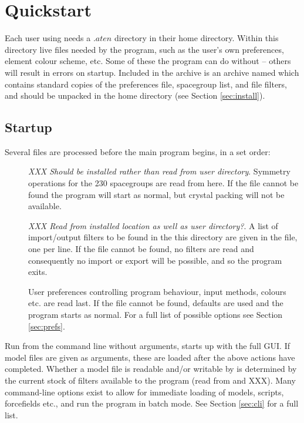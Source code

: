 \chapter{Quickstart}
\label{sec:quickstart}
Each user using \progname{} needs a $.aten$ directory in their home directory. Within this directory live files needed by the program, such as the user's own preferences, element colour scheme, etc. Some of these the program can do without -- others will result in errors on startup. Included in the archive is an archive named  which contains standard copies of the preferences file, spacegroup list, and file filters, and should be unpacked in the home directory (see Section \ref{sec:install}).\\


\section{Startup}
\label{sec:startup}
Several files are processed before the main program begins, in a set order:\\

\begin{description}
\item[{\it {}}\its]
	{\it XXX Should be installed rather than read from user directory}. Symmetry operations for the 230 spacegroups are read from here. If the file cannot be found the program will start as normal, but crystal packing will not be available.

\item[{\it {}}\its]
	{\it XXX Read from installed location as well as user directory?}. A list of import/output filters to be found in the this directory are given in the  file, one per line. If the file cannot be found, no filters are read and consequently no import or export will be possible, and so the program exits.

\item[{\it {}}\its]
	User preferences controlling program behaviour, input methods, colours etc. are read last. If the file cannot be found, defaults are used and the program starts as normal. For a full list of possible options see Section \ref{sec:prefs}.

\end{description}

Run from the command line without arguments, \progname{} starts up with the full GUI. If model files are given as arguments, these are loaded after the above actions have completed. Whether a model file is readable and/or writable by \progname{} is determined by the current stock of filters available to the program (read from  and XXX). Many command-line options exist to allow for immediate loading of models, scripts, forcefields etc., and run the program in batch mode. See Section \ref{sec:cli} for a full list.\\


